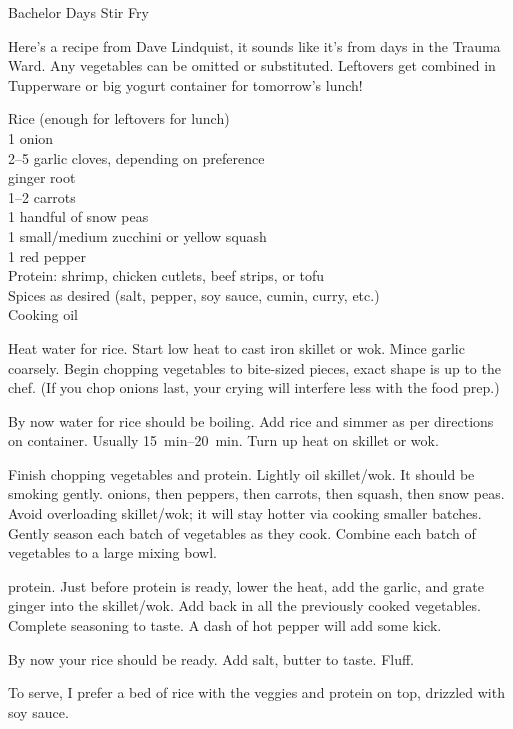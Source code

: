 \begin{entry}{Bachelor Days Stir Fry}

\begin{open}
  Here's a recipe from Dave Lindquist, it sounds like it's from days in the
  Trauma Ward. Any vegetables can be omitted or substituted. Leftovers get
  combined in Tupperware or big yogurt container for tomorrow's lunch!
\end{open}
\begin{ingredients}
    Rice (enough for leftovers for lunch)\\
    1 onion\\
    \numrange{2}{5} garlic cloves, depending on preference\\
    ginger root\\
    \numrange{1}{2} carrots\\
    1 handful of snow peas\\
    1 small/medium zucchini or yellow squash\\
    1 red pepper\\
    Protein: shrimp, chicken cutlets, beef strips, or tofu\\
    Spices as desired (salt, pepper, soy sauce, cumin, curry, etc.)\\
    Cooking oil
\end{ingredients}
Heat water for rice. Start low heat to cast iron skillet or wok. Mince garlic
coarsely. Begin chopping vegetables to bite-sized pieces, exact shape is up to
the chef. (If you chop onions last, your crying will interfere less with the
food prep.)

By now water for rice should be boiling. Add rice and simmer as per directions
on container. Usually \SIrange{15}{20}{\minute}. Turn up heat on skillet or
wok.

Finish chopping vegetables and protein. Lightly oil skillet/wok. It should be
smoking gently. \Saute onions, then peppers, then carrots, then squash, then
snow peas. Avoid overloading skillet/wok; it will stay hotter via cooking
smaller batches. Gently season each batch of vegetables as they cook. Combine
each batch of \sauteed vegetables to a large mixing bowl.

\Saute protein. Just before protein is ready, lower the heat, add the garlic,
and grate ginger into the skillet/wok. Add back in all the previously cooked
vegetables. Complete seasoning to taste. A dash of hot pepper will add some
kick.

By now your rice should be ready. Add salt, butter to taste. Fluff.

To serve, I prefer a bed of rice with the veggies and protein on top, drizzled
with soy sauce.
\end{entry}

